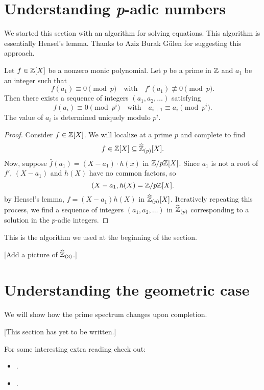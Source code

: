 \documentclass{ximera}
\begin{document}
\section{Understanding \textit{p}-adic numbers}

We started this section with an algorithm for solving equations. This
algorithm is essentially Hensel's lemma. Thanks to Aziz Burak G\"ulen
for suggesting this approach.

\begin{corollary}
  Let $f\in\mathbb Z[X]$ be a nonzero monic polynomial. Let $p$ be a prime in
  $\mathbb Z$ and $a_1$ be an integer such that
  \[
  f(a_1) \equiv 0 \pmod{p}\quad\text{with}\quad f'(a_1) \not\equiv 0\pmod{p}.
  \]
  Then there exists a sequence of integers $(a_1,a_2,\dots)$
  satisfying
  \[
  f(a_i) \equiv 0 \pmod{p^i}\quad\text{with}\quad a_{i+1} \equiv
  a_i\pmod{p^{i}}.
  \]
  The value of $a_i$ is determined uniquely modulo $p^i$.
  \begin{proof}
    Consider $f\in\mathbb Z[X]$. We will localize at a prime $p$ and complete to
    find
    \[
    f\in \mathbb Z[X] \subseteq \widehat{\mathbb Z}_{(p)}[X].
    \]
    Now, suppose $\bar{f}(a_1) = (X-a_1)\cdot h(x)$ in
    $\mathbb Z/p\mathbb Z[X]$. Since $a_1$ is not a root of $f'$, $(X-a_1)$ and
    $h(X)$ have no common factors, so
    \[
    (X-a_1,h(X) = \mathbb Z/p\mathbb Z[X].
    \]
    by Hensel's lemma, $f = (X-a_1)h(X)$ in
    $\widehat{\mathbb Z}_{(p)}[X]$. Iteratively repeating this process, we find a
    sequence of integers $(a_1,a_2,\dots)$ in $\widehat{\mathbb Z}_{(p)}$
    corresponding to a solution in the $p$-adic integers.
  \end{proof}
\end{corollary}

This is the algorithm we used at the beginning of the section.


[Add a picture of $\widehat{\mathbb Z}_{(3)}$.]

\section{Understanding the geometric case}

We will show how the prime spectrum changes upon completion.


[This section has yet to be written.]

For some interesting extra reading check out:
\begin{itemize}
\item {}. 

\item {}. 
\end{itemize}
\end{document}
